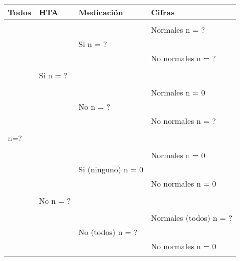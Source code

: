\documentclass[varwidth=true, border=10pt]{standalone}
\begin{document}
\begin{table}
\tiny
\centering
\begin{tabular}{llll}
\hline
\hline 
Todos  & HTA      & Medicaci\'on & Cifras \\
\hline
\hline 
       &                        &                    & \\
       &                        &                    & Normales n = ? \\
\cline{4-4}
       &                        & Si n = ?           &  \\
\cline{3-3}
       &                        &                    & No normales n = ?  \\
\cline{4-4}
       &                        &                    &   \\
       & Si n = ?               &                    &   \\
\cline{2-2}
       &                        &                    &   \\
       &                        &                    & Normales n = 0  \\
\cline{4-4}
       &                        & No n = ?   &  \\
\cline{3-3}
        &                       &                    & No normales n = ?  \\
\cline{4-4}

       &                        &                    & \\
n=? &                        &                    &    \\ 
\cline{1-1}
       &                        &                    &   \\
       &                        &                    & Normales n = 0\\
 \cline{4-4}
       &                        & Si (ninguno) n = 0           &  \\
 \cline{3-3}
       &                        &                    & No normales n = 0  \\
 \cline{4-4}
       &                        &                    &   \\
       & No n = ?      &                    &   \\
 \cline{2-2}
       &                        &                    &   \\
       &                        &                    & Normales (todos) n = ?  \\
\cline{4-4}
       &                        & No (todos) n = ?           &  \\
\cline{3-3}
        &                       &                    & No normales n = 0  \\
\cline{4-4}

       &                        &                    & \\
\hline \hline
\end{tabular}
\end{table}
\end{document}
